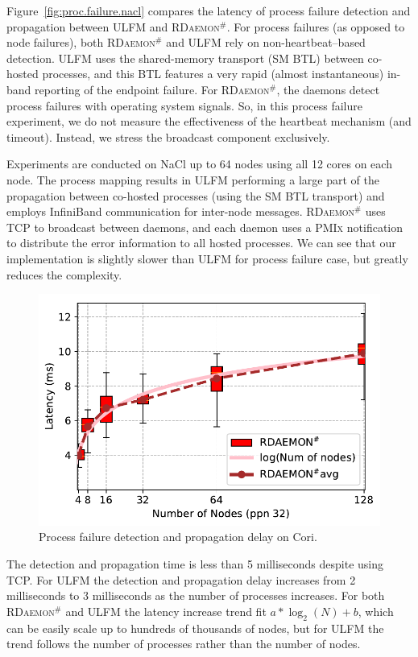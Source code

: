 \documentclass[5p,times,twocolumn]{elsarticle}
\newcommand{\pmix}[0]{\textsc{PMIx}\xspace}
\newcommand{\ulfm}[0]{\textsc{ULFM}\xspace}
\newcommand{\ourwork}[0]{\textsc{RDaemon}\ensuremath{^\#}\xspace}
\begin{document}
Figure~\ref{fig:proc.failure.nacl} compares the latency of process failure detection and propagation between \ulfm and \ourwork. For process failures (as opposed to node failures), both
\ourwork and \ulfm rely on non-heartbeat--based detection.
%
\ulfm uses the
shared-memory transport (SM BTL) between co-hosted processes, and this BTL
features a very rapid (almost instantaneous) in-band reporting of the
endpoint failure. For \ourwork, the daemons detect process failures
with operating system signals.
%
So, in this process failure experiment, we do not measure
the effectiveness of the heartbeat mechanism (and timeout). Instead, we
stress the broadcast component exclusively.

Experiments are conducted on NaCl up to 64 nodes using all 12 cores on each node.
The process mapping results in \ulfm performing a large part of the
propagation between co-hosted processes (using the SM BTL transport)
and employs InfiniBand communication for inter-node messages.
\ourwork uses TCP to broadcast between daemons, and each daemon uses a
\pmix notification to distribute the error information to all hosted processes.
 We can see that our implementation is slightly slower than \ulfm for process failure case, but greatly reduces the complexity.
%
\begin{figure}[h]
  \centering
  \includegraphics[width=\linewidth]{Cori_Process_Failure_fit.pdf}\vspace{-1em}
  \caption{Process failure detection and propagation delay on Cori.}
  \label{fig:proc.failure.cori}
\end{figure}
The detection and propagation time is less than 5 milliseconds despite using TCP. For \ulfm the detection and propagation delay increases from 2 milliseconds to 3 milliseconds as the  number of processes increases. For both \ourwork and \ulfm the latency increase trend fit $ a*\log_2(N) + b $, which can be easily scale up to hundreds of thousands of nodes, but for \ulfm
the trend follows the number of processes rather than the number of nodes.
\end{document}
